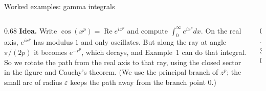 \documentclass[11pt]{beamer}
\begin{document}
\begin{frame}[allowframebreaks=1.00]{Worked examples: gamma integrals}
\begin{columns}[T]
\begin{column}{0.68\textwidth}
\textbf{Idea.} Write \(\cos(x^p)=\operatorname{Re}e^{ix^p}\) and compute
\(\int_0^\infty e^{ix^p}dx\). On the real axis, \(e^{ix^p}\) has modulus \(1\) and only oscillates.
But along the ray at angle \(\pi/(2p)\) it becomes \(e^{-r^p}\), which decays, and Example~1 can
do that integral. So we rotate the path from the real axis to that ray, using the closed
sector in the figure and Cauchy's theorem. (We use the principal branch of \(z^p\); the small
arc of radius \(\varepsilon\) keeps the path away from the branch point \(0\).)
\end{column}
\begin{column}{0.30\textwidth}
\centering
{}
\end{column}
\end{columns}


\end{frame}
\end{document}
